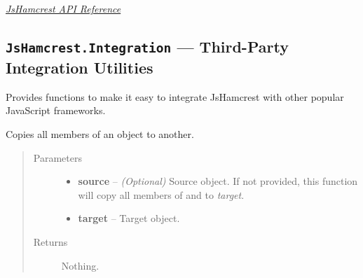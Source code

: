 \documentclass[letterpaper,10pt,english]{sphinxmanual}
\begin{document}


{\hyperref[modules/index:apiref]{\emph{JsHamcrest API Reference}}}




\subsection{\texttt{JsHamcrest.Integration} --- Third-Party Integration Utilities}
\label{modules/integration:module-JsHamcrest.Integration}\label{modules/integration::doc}\label{modules/integration:jshamcrest-integration-third-party-integration-utilities}
Provides functions to make it easy to integrate JsHamcrest with other popular
JavaScript frameworks.

\begin{fulllineitems}
\label{modules/integration:JsHamcrest.Integration.copyMembers}
Copies all members of an object to another.
\begin{quote}\begin{description}
\item[{Parameters}] \leavevmode\begin{itemize}
\item {} 
\textbf{source} -- \emph{(Optional)} Source object. If not provided, this function will
copy all members of {\hyperref[modules/matchers:module-JsHamcrest.Matchers]{}} and
{\hyperref[modules/operator:module-JsHamcrest.Operators]{}} to \emph{target}.

\item {} 
\textbf{target} -- Target object.

\end{itemize}

\item[{Returns}] \leavevmode
Nothing.

\end{description}\end{quote}

\end{fulllineitems}

\end{document}
